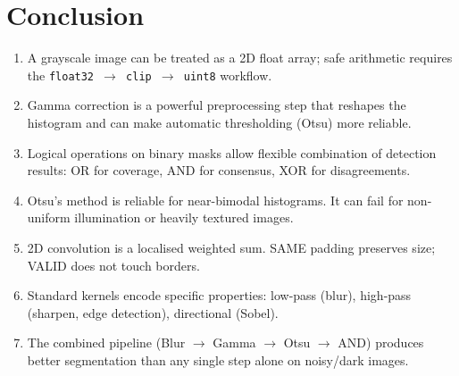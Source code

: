 \documentclass[12pt,a4paper]{article}
\begin{document}
\section{Conclusion}

\begin{enumerate}
  \item A grayscale image can be treated as a 2D float array; safe arithmetic
        requires the \texttt{float32 $\to$ clip $\to$ uint8} workflow.
  \item Gamma correction is a powerful preprocessing step that reshapes the
        histogram and can make automatic thresholding (Otsu) more reliable.
  \item Logical operations on binary masks allow flexible combination of detection
        results: OR for coverage, AND for consensus, XOR for disagreements.
  \item Otsu's method is reliable for near-bimodal histograms. It can fail for
        non-uniform illumination or heavily textured images.
  \item 2D convolution is a localised weighted sum. SAME padding preserves size;
        VALID does not touch borders.
  \item Standard kernels encode specific properties:
        low-pass (blur), high-pass (sharpen, edge detection), directional (Sobel).
  \item The combined pipeline (Blur $\to$ Gamma $\to$ Otsu $\to$ AND) produces
        better segmentation than any single step alone on noisy/dark images.
\end{enumerate}
\end{document}
